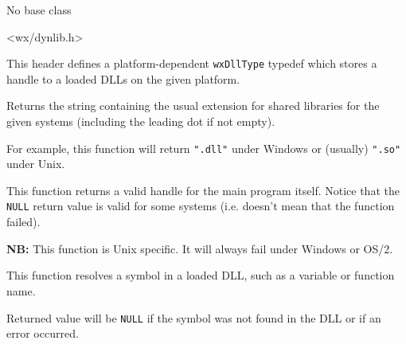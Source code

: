 
No base class


<wx/dynlib.h>


This header defines a platform-dependent {\tt wxDllType} typedef which stores
a handle to a loaded DLLs on the given platform.


\label{wxdllloadergetdllext}


Returns the string containing the usual extension for shared libraries for the
given systems (including the leading dot if not empty).

For example, this function will return {\tt ".dll"} under Windows or (usually) 
{\tt ".so"} under Unix.

\label{wxdllloadergetprogramhandle}


This function returns a valid handle for the main program itself. Notice that
the {\tt NULL} return value is valid for some systems (i.e. doesn't mean that
the function failed).

{\bf NB:} This function is Unix specific. It will always fail under Windows
or OS/2.

\label{wxdllloadergetsymbol}


This function resolves a symbol in a loaded DLL, such as a variable or
function name.

Returned value will be {\tt NULL} if the symbol was not found in the DLL or if
an error occurred.




\label{wxdllloaderloadlibrary}


